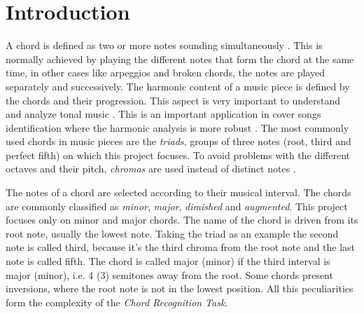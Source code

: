 \section{Introduction}
\label{sec:intro}

A chord is defined as two or more notes sounding simultaneously \cite{benward2014music}. This is normally achieved by playing the different notes that form the chord at the same time, in other cases like arpeggios and broken chords, the notes are played separately and successively. The harmonic content of a music piece is defined by the chords and their progression. This aspect is very important to understand and analyze tonal music \cite{papadopoulos2007large}. This is an important application in cover songs identification where the harmonic analysis is more robust \cite{lee2006identifying}. The most commonly used chords in music pieces are the \textit{triads}, groups of three notes (root, third and perfect fifth) on which this project focuses. To avoid problems with the different octaves and their pitch, \textit{chromas} are used instead of distinct notes \cite{bartsch2005audio}.

The notes of a chord are selected according to their musical interval. The chords are commonly classified as \textit{minor}, \textit{major}, \textit{dimished} and \textit{augmented}. This project focuses only on minor and major chords. The name of the chord is driven from its root note, usually the lowest note. Taking the triad as an example the second note is called third, because it's the third chroma from the root note and the last note is called fifth. The chord is called major (minor) if the third interval is major (minor), i.e. 4 (3) semitones away from the root. Some chords present inversions, where the root note is not in the lowest position. All this peculiarities form the complexity of the \textit{Chord Recognition Task}.